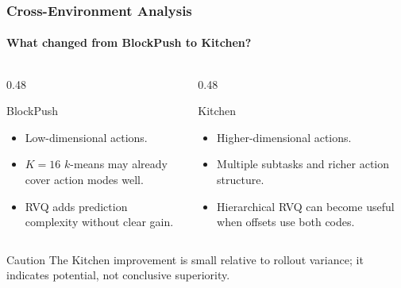 \documentclass[aspectratio=169]{ctexbeamer}
\begin{document}
\begin{frame}
  \frametitle{Cross-Environment Analysis}
  \framesubtitle{What changed from BlockPush to Kitchen?}
  \begin{columns}[T]
    \begin{column}{0.48\textwidth}
      \begin{block}{BlockPush}
        \begin{itemize}
          \item Low-dimensional actions.
          \item $K=16$ $k$-means may already cover action modes well.
          \item RVQ adds prediction complexity without clear gain.
        \end{itemize}
      \end{block}
    \end{column}
    \begin{column}{0.48\textwidth}
      \begin{block}{Kitchen}
        \begin{itemize}
          \item Higher-dimensional actions.
          \item Multiple subtasks and richer action structure.
          \item Hierarchical RVQ can become useful when offsets use both codes.
        \end{itemize}
      \end{block}
    \end{column}
  \end{columns}
  \vspace{0.5em}
  \begin{alertblock}{Caution}
    The Kitchen improvement is small relative to rollout variance; it indicates potential, not conclusive superiority.
  \end{alertblock}
\end{frame}
\end{document}
